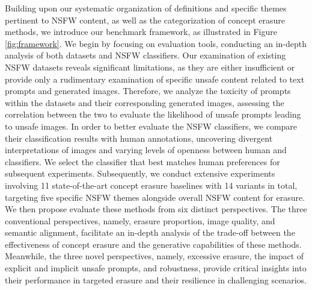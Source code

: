 Building upon our systematic organization of definitions and specific themes pertinent to NSFW content, as well as the categorization of concept erasure methods, we introduce our benchmark framework, as illustrated in Figure \ref{fig:framework}.
We begin by focusing on evaluation tools, conducting an in-depth analysis of both datasets and NSFW classifiers.
Our examination of existing NSFW datasets reveals significant limitations, as
they are either insufficient or provide only a rudimentary examination of specific unsafe content related to text prompts and generated images. Therefore, we analyze the toxicity of prompts within the datasets and their corresponding generated images, 
assessing the correlation between the two to evaluate the likelihood of unsafe prompts leading to unsafe images.
In order to better evaluate the NSFW classifiers, we compare their classification results with human annotations, uncovering divergent interpretations of images and varying levels of openness between human and classifiers. We select the %
classifier that best matches human preferences for subsequent experiments.
Subsequently, we conduct extensive experiments involving 11 state-of-the-art concept erasure baselines with 14 variants in total, targeting five specific NSFW themes alongside overall NSFW content for erasure. 
We then propose evaluate these methods from six distinct perspectives. The three conventional perspectives, namely, erasure proportion, image quality, and semantic alignment, 
facilitate an in-depth analysis of the trade-off between the effectiveness of concept erasure and the generative capabilities of these methods.
Meanwhile, the three novel perspectives, namely, excessive erasure, the impact of explicit and implicit unsafe prompts, and robustness, provide critical insights into their performance in targeted erasure and their resilience in challenging scenarios.

